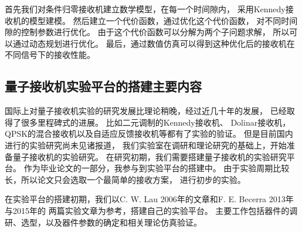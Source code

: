 首先我们对条件归零接收机建立数学模型，在每一个时间隙内，
采用Kennedy接收机的模型建模。
然后建立一个代价函数，通过优化这个代价函数，
对不同时间隙的控制参数进行优化。
由于这个代价函数可以分解为两个子问题求解，
所以可以通过动态规划进行优化。
最后，通过数值仿真可以得到这种优化后的接收机在不同信号下的接收性能。

\subsection{量子接收机实验平台的搭建主要内容}
国际上对量子接收机实验的研究发展比理论稍晚，经过近几十年的发展，
已经取得了很多里程碑式的进展。
比如二元调制的Kennedy接收机\cite{lau2006binary}、
Dolinar接收机\cite{lau2006binary,cook2007optical}，
QPSK的混合接收机以及自适应反馈接收机等都有了实验的验证\cite{muller2012quadrature,becerra2013experimental}。
但是目前国内进行的实验研究尚未见诸报道，
我们实验室在调研和理论研究的基础上，开始准备量子接收机的实验研究。
在研究初期，我们需要搭建量子接收机的实验研究平台。
作为毕业论文的一部分，我参与到实验平台的搭建中。
由于实验周期比较长，所以论文只会选取一个最简单的接收方案，
进行初步的实验。

在实验平台的搭建初期，我们以C. W. Lau 2006年的文章和F. E. Becerra 2013年与2015年的
两篇实验文章为参考\cite{lau2006binary,becerra2013experimental,becerra2015photon}，搭建自己的实验平台。
主要工作包括器件的调研、选型，以及器件参数的确定和相关理论仿真验证。 

